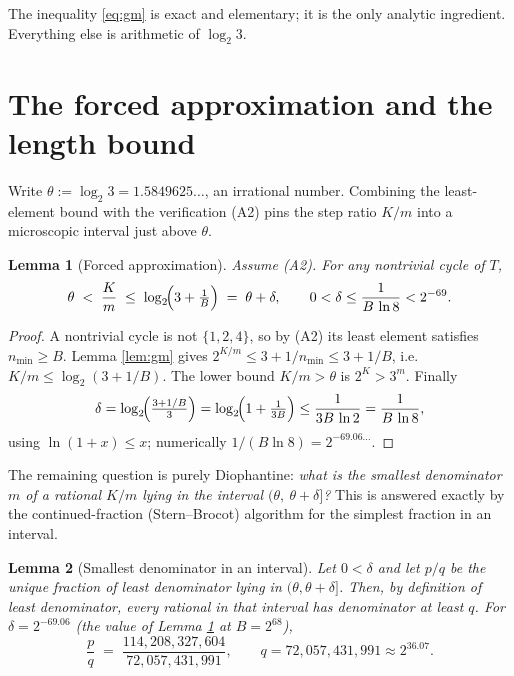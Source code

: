 \documentclass[11pt]{article}
\newtheorem{lemma}{Lemma}
\theoremstyle{definition}
\newcommand{\nmin}{n_{\min}}
\begin{document}
\noindent
The inequality \eqref{eq:gm} is exact and elementary; it is the only analytic
ingredient. Everything else is arithmetic of $\log_2 3$.

\section{The forced approximation and the length bound}\label{sec:main}

Write $\theta := \log_2 3 = 1.5849625\ldots$, an irrational number. Combining the
least-element bound with the verification (A2) pins the step ratio $K/m$ into a
microscopic interval just above $\theta$.

\begin{lemma}[Forced approximation]\label{lem:forced}
Assume (A2). For any nontrivial cycle of $T$,
\begin{equation}\label{eq:forced}
  \theta \;<\; \frac{K}{m} \;\le\; \log_2\!\Bigl(3 + \tfrac1{B}\Bigr)
  \;=\; \theta + \delta, \qquad
  0 < \delta \le \frac{1}{B\,\ln 8} < 2^{-69}.
\end{equation}
\end{lemma}

\begin{proof}
A nontrivial cycle is not $\{1,2,4\}$, so by (A2) its least element satisfies
$\nmin \ge B$. Lemma \ref{lem:gm} gives $2^{K/m} \le 3 + 1/\nmin \le 3 + 1/B$,
i.e.\ $K/m \le \log_2(3+1/B)$. The lower bound $K/m>\theta$ is $2^{K}>3^{m}$.
Finally
\[
  \delta = \log_2\!\Bigl(\tfrac{3+1/B}{3}\Bigr)
         = \log_2\!\Bigl(1 + \tfrac1{3B}\Bigr)
         \le \frac{1}{3B\,\ln 2} = \frac1{B\,\ln 8},
\]
using $\ln(1+x)\le x$; numerically $1/(B\ln 8) = 2^{-69.06\ldots}$.
\end{proof}

The remaining question is purely Diophantine: \emph{what is the smallest
denominator $m$ of a rational $K/m$ lying in the interval
$(\theta,\ \theta+\delta]$?} This is answered exactly by the continued-fraction
(Stern--Brocot) algorithm for the simplest fraction in an interval.

\begin{lemma}[Smallest denominator in an interval]\label{lem:simplest}
Let $0<\delta$ and let $p/q$ be the unique fraction of least denominator lying in
$(\theta,\theta+\delta]$. Then, by definition of least denominator, every rational
in that interval has denominator at least $q$. For $\delta = 2^{-69.06}$
(the value of Lemma \ref{lem:forced} at $B=2^{68}$),
\[
  \frac{p}{q} \;=\; \frac{114{,}208{,}327{,}604}{72{,}057{,}431{,}991},
  \qquad q = 72{,}057{,}431{,}991 \approx 2^{36.07}.
\]
\end{lemma}
\end{document}
